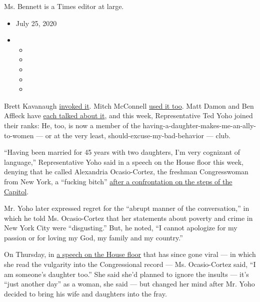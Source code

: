 Ms. Bennett is a Times editor at large.

\begin{itemize}
\item
  July 25, 2020
\item
  \begin{itemize}
  \item
  \item
  \item
  \item
  \item
  \end{itemize}
\end{itemize}

Brett Kavanaugh
\href{https://www.vox.com/2018/9/27/17911474/supreme-court-brett-kavanaugh-crying}{invoked
it}. Mitch McConnell
\href{https://www.politico.com/story/2016/10/mcconnell-trump-must-apologize-for-repugnant-comments-229332}{used
it too}. Matt Damon and Ben Affleck have
\href{https://www.vulture.com/2017/10/damon-affleck-father-of-daughters-excuse-harvey-weinstein.html}{each
talked about it}, and this week, Representative Ted Yoho joined their
ranks: He, too, is now a member of the
having-a-daughter-makes-me-an-ally-to-women --- or at the very least,
should-excuse-my-bad-behavior --- club.

``Having been married for 45 years with two daughters, I'm very
cognizant of language,'' Representative Yoho said in a speech on the
House floor this week, denying that he called Alexandria Ocasio-Cortez,
the freshman Congresswoman from New York, a ``fucking bitch''
\href{https://thehill.com/homenews/house/508259-ocaasio-cortez-accosted-by-gop-lawmaker-over-remarks-that-kind-of}{after
a confrontation on the steps of the Capitol}.

Mr. Yoho later expressed regret for the ``abrupt manner of the
conversation,'' in which he told Ms. Ocasio-Cortez that her statements
about poverty and crime in New York City were ``disgusting.'' But, he
noted, ``I cannot apologize for my passion or for loving my God, my
family and my country.''

On Thursday, in
\href{https://www.nytimes3xbfgragh.onion/2020/07/23/us/politics/aoc-women-ted-yoho.html}{a
speech on the House floor} that has since gone viral --- in which she
read the vulgarity into the Congressional record --- Ms. Ocasio-Cortez
said, ``I am someone's daughter too.'' She said she'd planned to ignore
the insults --- it's ``just another day'' as a woman, she said --- but
changed her mind after Mr. Yoho decided to bring his wife and daughters
into the fray.

